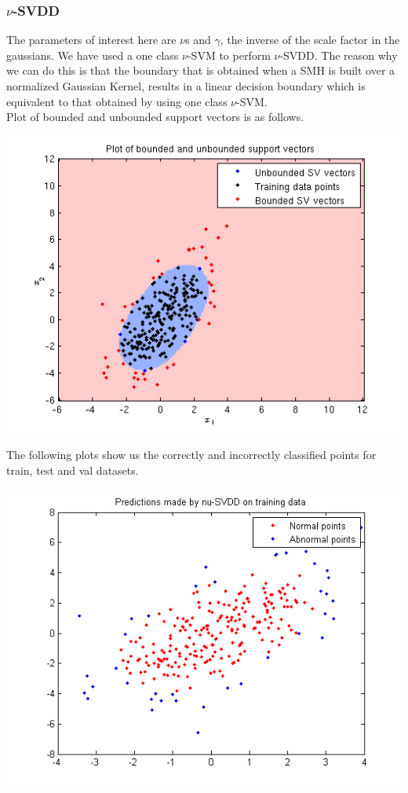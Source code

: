 \documentclass{article}
\begin{document}
\subsubsection{$\nu$-SVDD}
The parameters of interest here are $\nu$s and $\gamma$, the inverse of the scale factor in the gaussians. We have used a one class $\nu$-SVM to perform $\nu$-SVDD. The reason why we can do this is that the boundary that is obtained when a SMH is built over a normalized Gaussian Kernel, results in a linear decision boundary which is equivalent to that obtained by using one class $\nu$-SVM. \\[10pt]
Plot of bounded and unbounded support vectors is as follows.
\begin{center}
\includegraphics[scale=1]{SVDD/nu/SV}
\end{center}
The following plots show us the correctly and incorrectly classified points for train, test and val datasets.
\begin{center}
\includegraphics[scale=.8]{SVDD/nu/train_plot}
\end{center}
\end{document}
